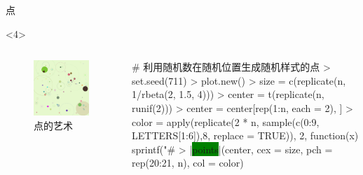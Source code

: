 \documentclass{beamerthemeMono}
\begin{document}
\begin{frame}[t,fragile]{\subsecname}{点}
\begin{overlayarea}{\textwidth}{\textheight}
\begin{onlyenv}<4>
  \begin{columns}
    \begin{column}{.4\textwidth}
\centering
\begin{figure}
    \includegraphics[width=\columnwidth]{points-art03.png}
    \caption{点的艺术}
\end{figure}
    \end{column}

    \begin{column}{.6\textwidth}
\centering
\begin{rcode}
# 利用随机数在随机位置生成随机样式的点
> set.seed(711)
> plot.new()
> size = c(replicate(n, 1/rbeta(2, 1.5, 4)))
> center = t(replicate(n, runif(2)))
> center = center[rep(1:n, each = 2), ]
> color = apply(replicate(2 * n, sample(c(0:9, LETTERS[1:6]),8, replace = TRUE)),
              2, function(x) sprintf("#%
> |\colorbox{green}{points}|(center, cex = size, pch = rep(20:21, n), col = color)
\end{rcode}
    \end{column}
  \end{columns}
\end{onlyenv}


\end{overlayarea}
\end{frame}
\end{document}
